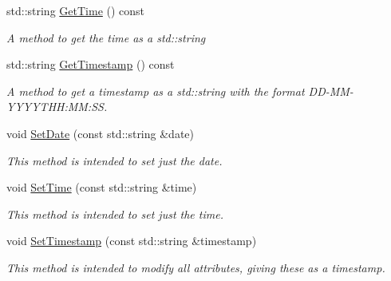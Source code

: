 \begin{DoxyCompactItemize}
std\+::string \hyperlink{structTimeData_a6810621b9bd2289b697a7cd7b1799515}{Get\+Time} () const
\begin{DoxyCompactList}\small\item\em A method to get the time as a {\ttfamily std\+::string} \end{DoxyCompactList}\item 
\mbox{\label{structTimeData_a06956ece691807dc69e4fe6add2bd423}} 
std\+::string \hyperlink{structTimeData_a06956ece691807dc69e4fe6add2bd423}{Get\+Timestamp} () const
\begin{DoxyCompactList}\small\item\em A method to get a timestamp as a {\ttfamily std\+::string} with the format D\+D-\/\+M\+M-\/\+Y\+Y\+Y\+Y\+T\+HH\+:MM\+:SS. \end{DoxyCompactList}\item 
\mbox{\label{structTimeData_ac4a84f214fbaeaac5fa77df2c68bad79}} 
void \hyperlink{structTimeData_ac4a84f214fbaeaac5fa77df2c68bad79}{Set\+Date} (const std\+::string \&date)
\begin{DoxyCompactList}\small\item\em This method is intended to set just the date. \end{DoxyCompactList}\item 
\mbox{\label{structTimeData_a79c359b6aa1d5362065105d0e6b2f657}} 
void \hyperlink{structTimeData_a79c359b6aa1d5362065105d0e6b2f657}{Set\+Time} (const std\+::string \&time)
\begin{DoxyCompactList}\small\item\em This method is intended to set just the time. \end{DoxyCompactList}\item 
\mbox{\label{structTimeData_a753d18acb1fdebbde3e910e2462b4073}} 
void \hyperlink{structTimeData_a753d18acb1fdebbde3e910e2462b4073}{Set\+Timestamp} (const std\+::string \&timestamp)
\begin{DoxyCompactList}\small\item\em This method is intended to modify all attributes, giving these as a timestamp. \end{DoxyCompactList}\item 
\mbox{\label{structTimeData_ad204062485d50c24aad1d4b41a582bd8}} 

\end{DoxyCompactItemize}
